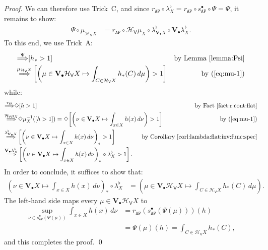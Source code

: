 \documentclass[preprint,12pt]{elsarticle}
\newcommand\Angel{{\mathtt{A}}}
\newcommand\Nature{{\mathtt{P}}}
\newcommand\AN{{\Angel\Nature}}
\newcommand\invto[1]{{\buildrel {#1} \over\Longrightarrow}}
\newcommand\Hoare{{\mathcal H}}
\newcommand\Vt{\mathsf{V}}
\newcommand\HV{\Hoare_\Vt}
\newcommand\Val{{\mathbf V}}
\begin{document}
\begin{proof}
  We can therefore use Trick~C, and since $r_\AN \circ {\lambda^\flat_X} =
  r_\AN \circ s_\AN^\bullet \circ \Psi = \Psi$, it remains to show:
  \begin{align*}
    \Psi \circ \mu_{\HV X}
    & = r_\AN \circ \HV {\mu_X} \circ \lambda^\flat_{\Val_\bullet X} \circ \Val_\bullet {\lambda^\flat_X}.
  \end{align*}
  To this end, we use Trick~A:
  \begin{align*}
    [h > 1]
    & \invto{\Psi}
      [h_* > 1]
    & \text{by Lemma~\ref{lemma:Psi}} \\
    & \invto{\mu_{\HV X}}
      \left[\left(\mu \in \Val_\bullet {\HV X} \mapsto \int_{C \in \HV X} h_*
      (C) \,d\mu\right) > 1\right]
    & \text{by (\ref{eq:mu-1})}
  \end{align*}
  while:
  \begin{align*}
    [h > 1]
    & \invto{r_\AN}
      \Diamond {[h > 1]}
    & \text{by Fact~\ref{fact:r:cont:flat}} \\
    & \invto{\HV {\mu_X}}
      \Diamond {\mu_X^{-1} ([h > 1])}
      = \Diamond {\left[\left(\nu \in \Val_\bullet X \mapsto \int_{x \in X} h (x)
      \,d\nu\right) > 1\right]}
      \mskip-80mu
    & \text{by (\ref{eq:mu-1})} \\
    & \invto{\lambda^\flat_{\Val_\bullet X}}
      \left[\left(\nu \in \Val_\bullet X \mapsto \int_{x \in X} h (x)
      \,d\nu\right)_* > 1\right]
    & \text{by Corollary~\ref{corl:lambda:flat:inv:func:spec}} \\
    & \invto{\Val_\bullet {\lambda^\flat_X}}
      \left[\left(\nu \in \Val_\bullet X \mapsto \int_{x \in X} h (x)
      \,d\nu\right)_* \circ {\lambda^\flat_X} > 1\right].
  \end{align*}
  In order to conclude, it suffices to show that:
  \begin{align*}
    \left(\nu \in \Val_\bullet X \mapsto \int_{x \in X} h (x)
    \,d\nu\right)_* \circ {\lambda^\flat_X}
    & = (\mu \in \Val_\bullet {\HV X} \mapsto \int_{C \in \HV X} h_*
      (C) \,d\mu).
  \end{align*}
  The left-hand side maps every $\mu \in \Val_\bullet {\HV X}$ to
  \begin{align*}
    \sup_{\nu \in s_\AN^\bullet (\Psi (\mu))} \int_{x \in X} h (x)
    \,d\nu
    & = r_\AN (s_\AN^\bullet (\Psi (\mu))) (h) \\
    & = \Psi (\mu) (h) = \int_{C \in \HV X} h_*
      (C),
  \end{align*}
  and this completes the proof.  \qed
\end{proof}
\end{document}

